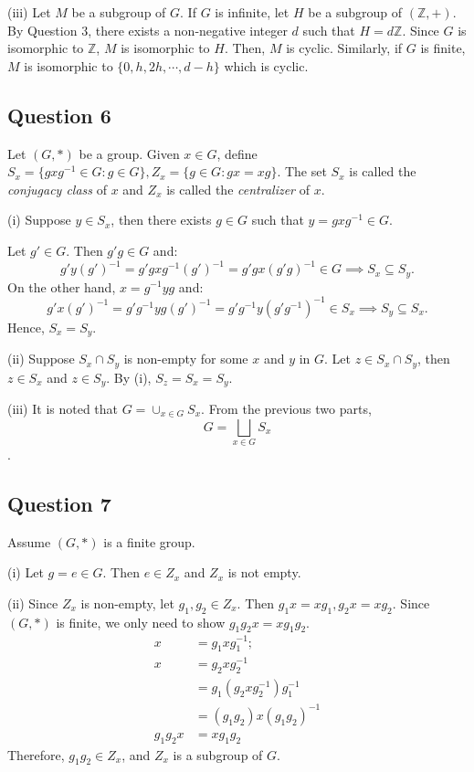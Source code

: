 \documentclass{article}
\begin{document}
(iii) Let $M$ be a subgroup of $G$. If $G$ is infinite, let $H$ be a subgroup of $(\mathbb{Z},+)$. By Question 3, there exists a non-negative integer $d$ such that $H = d\mathbb{Z}$. Since $G$ is isomorphic to $\mathbb{Z}$, $M$ is isomorphic to $H$. Then, $M$ is cyclic. Similarly, if $G$ is finite, $M$ is isomorphic to $\{0,h,2h,\cdots,d-h\}$ which is cyclic.

\subsection*{Question 6}
Let $(G,*)$ be a group. Given $x\in G$, define $S_x = \{gxg^{-1}\in G : g\in G\}, Z_x = \{g\in G: gx=xg\}$. The set $S_x$ is called the \textit{conjugacy class} of $x$ and $Z_x$ is called the \textit{centralizer} of $x$.

(i) Suppose $y \in S_x$, then there exists $g\in G$ such that $y=gxg^{-1}\in G$. 

Let $g' \in G$. Then $g'g\in G$ and:
\[g'y(g')^{-1} = g'gxg^{-1}(g')^{-1} = g'gx(g'g)^{-1}\in G \implies S_x\subseteq S_y.\]
On the other hand, $x = g^{-1}yg$ and:
\[g'x(g')^{-1} =g'g^{-1}yg(g')^{-1} = g'g^{-1}y(g'g^{-1})^{-1}\in S_x\implies S_y\subseteq S_x.\]
Hence, $S_x=S_y$.

(ii) Suppose $S_x\cap S_y$ is non-empty for some $x$ and $y$ in $G$. Let $z\in S_x\cap S_y$, then $z\in S_x$ and $z\in S_y$. By (i), $S_z=S_x=S_y$.

(iii) It is noted that $G = \cup_{x\in G}S_x$. From the previous two parts, 
\[G = \bigsqcup_{x\in G}S_x\].

\subsection*{Question 7}
Assume $(G,*)$ is a finite group.

(i) Let $g=e\in G$. Then $e\in Z_x$ and $Z_x$ is not empty.

(ii) Since $Z_x$ is non-empty, let $g_1, g_2\in Z_x$. Then $g_1x=xg_1, g_2x=xg_2$. Since $(G,*) $ is finite, we only need to show $g_1g_2x=xg_1g_2$.
\begin{align*}
    x &= g_1xg_1^{-1};\\
    x &= g_2xg_2^{-1}\\&= g_1( g_2xg_2^{-1})g_1^{-1}\\&= (g_1g_2)x(g_1g_2)^{-1}\\
    g_1g_2x&=xg_1g_2
\end{align*}
Therefore, $g_1g_2\in Z_x$, and $Z_x$ is a subgroup of $G$.
\end{document}
